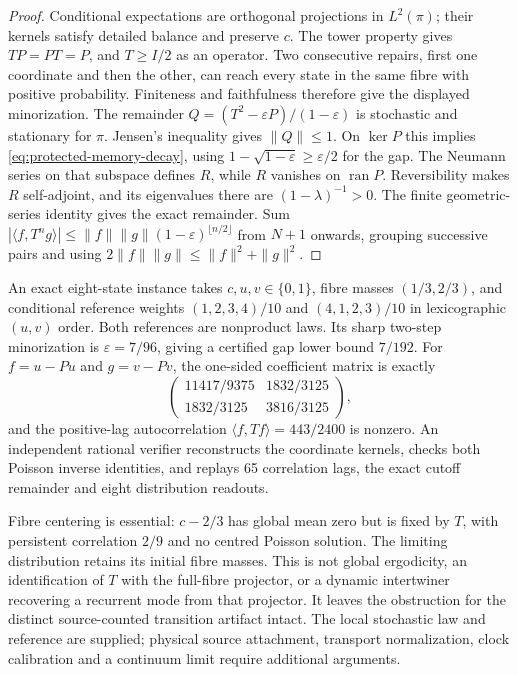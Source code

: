 \begin{proof}
Conditional expectations are orthogonal projections in $L^2(\pi)$;
their kernels satisfy detailed balance and preserve $c$. The tower property
gives $TP=PT=P$, and $T\ge I/2$ as an operator. Two consecutive repairs,
first one coordinate and then the other, can reach every state in the same
fibre with positive probability. Finiteness and faithfulness therefore give
the displayed minorization. The remainder
$Q=(T^2-\varepsilon P)/(1-\varepsilon)$ is stochastic and stationary for
$\pi$. Jensen's inequality gives $\|Q\|\le1$. On $\ker P$ this implies
\eqref{eq:protected-memory-decay}, using
$1-\sqrt{1-\varepsilon}\ge\varepsilon/2$ for the gap.
The Neumann series on that subspace defines $R$, while $R$ vanishes on
$\operatorname{ran}P$. Reversibility makes $R$ self-adjoint, and its
eigenvalues there are $(1-\lambda)^{-1}>0$. The finite geometric-series
identity gives the exact remainder. Sum
$|\langle f,T^ng\rangle|\le\|f\|\|g\|
(1-\varepsilon)^{\lfloor n/2\rfloor}$ from $N+1$ onwards, grouping
successive pairs and using $2\|f\|\|g\|\le\|f\|^2+\|g\|^2$.
\end{proof}

An exact eight-state instance takes $c,u,v\in\{0,1\}$, fibre masses
$(1/3,2/3)$, and conditional reference weights
$(1,2,3,4)/10$ and $(4,1,2,3)/10$ in lexicographic $(u,v)$ order.
Both references are nonproduct laws. Its sharp two-step minorization is
$\varepsilon=7/96$, giving a certified gap lower bound $7/192$.
For $f=u-Pu$ and $g=v-Pv$, the one-sided coefficient matrix is exactly
\[
 \begin{pmatrix}11417/9375&1832/3125\\
                 1832/3125&3816/3125\end{pmatrix},
\]
and the positive-lag autocorrelation $\langle f,Tf\rangle=443/2400$
is nonzero. An independent rational verifier reconstructs the coordinate
kernels, checks both Poisson inverse identities, and replays 65 correlation
lags, the exact cutoff remainder and eight distribution readouts.

Fibre centering is essential: $c-2/3$ has global mean zero but is fixed by
$T$, with persistent correlation $2/9$ and no centred Poisson solution.
The limiting distribution retains its initial fibre masses. This is not
global ergodicity, an identification of $T$ with the full-fibre projector,
or a dynamic intertwiner recovering a recurrent mode from that projector.
It leaves the obstruction for the distinct source-counted transition
artifact intact. The local stochastic law and reference are supplied;
physical source attachment, transport normalization, clock calibration
and a continuum limit require additional arguments.
